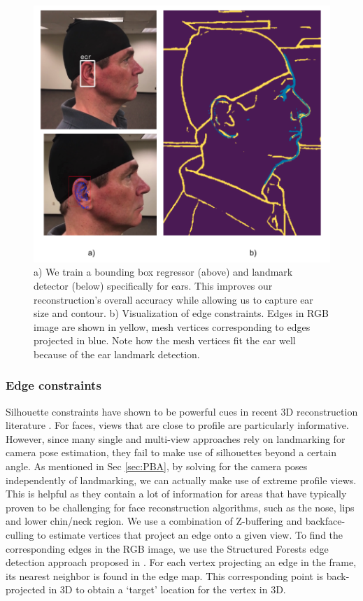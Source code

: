 \documentclass[10pt,twocolumn,letterpaper]{article}
\begin{document}
\begin{figure}[t]
\begin{center}
   \includegraphics[width=0.95\linewidth]{images/ear_lm_and_edges.png}
\end{center}
   \caption{ a) We train a bounding box regressor (above) and landmark detector (below) specifically for ears. This improves our reconstruction's overall accuracy while allowing us to capture ear size and contour. b) Visualization of edge constraints. Edges in RGB image are shown in yellow, mesh vertices corresponding to edges projected in blue. Note how the mesh vertices fit the ear well because of the ear landmark detection. }
\label{fig:ear_lm_and_edges}
\end{figure}





\subsubsection{Edge constraints}
Silhouette constraints have shown to be powerful cues in recent 3D reconstruction literature \cite{alldieck2018detailed,bas2016fitting}. For faces, views that are close to profile are particularly informative. However, since many single and multi-view approaches rely on landmarking for camera pose estimation, they fail to make use of silhouettes beyond a certain angle.
As mentioned in Sec \ref{sec:PBA}, by solving for the camera poses independently of landmarking, we can actually make use of extreme profile views. This is helpful as they contain a lot of information for areas that have typically proven to be challenging for face reconstruction algorithms, such as the nose, lips and lower chin/neck region.
We use a combination of Z-buffering \cite{Foley1990ComputerG} and backface-culling  to estimate vertices that project an edge onto a given view. To find the corresponding edges in the RGB image, we use the Structured Forests edge detection approach proposed in \cite{dollar2013structured}. For each vertex projecting an edge in the frame, its nearest neighbor is found in the edge map. This corresponding point is back-projected in 3D to obtain a `target' location for the vertex in 3D.
\end{document}
